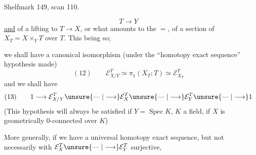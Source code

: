 Shelfmark 149, scan 110.


\[
T\longrightarrow Y
\]
\uline{and} of a lifting to $T\longrightarrow X$, or what amounts to the $=$, of a section of $X_T=X\times_YT$ over $T$. This being so;


we shall have a canonical isomorphism (under the ``homotopy exact sequence'' hypothesis made)
\[
(12)\qquad \mathcal E_{X/Y}^T\simeq\pi_1(X_T;T)\simeq\mathcal E_{X_T}^T
\]
and we shall have
\[
(13)\qquad 1\longrightarrow\mathcal E_{X/Y}^T\unsure{\mathrel{\text{---}}|\longrightarrow}\mathcal E_X^T\unsure{\mathrel{\text{---}}|\longrightarrow}\mathcal E_Y^T\unsure{\mathrel{\text{---}}|\longrightarrow}1
\]
(This hypothesis will always be satisfied if $Y=\operatorname{Spec}K$, $K$ a field, if $X$ is geometrically $0$-connected over $K$)

More generally, if we have a universal homotopy exact sequence, but not necessarily with $\mathcal E_X^T\unsure{\mathrel{\text{---}}|\longrightarrow}\mathcal E_Y^T$ surjective,

